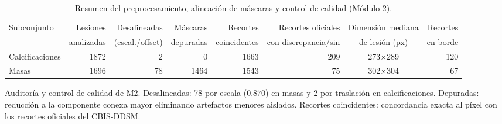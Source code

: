 \begin{table}[H]
\centering
\small
\caption{Resumen del preprocesamiento, alineación de máscaras y control de calidad (Módulo 2).}
\label{tab:anexo_m2_resumen}
\begin{adjustbox}{max width=\linewidth}
\begin{tabular}{l r r r r r c r}
\toprule
Subconjunto & Lesiones & Desalineadas & Máscaras & Recortes & Recortes oficiales & Dimensión mediana & Recortes \\
 & analizadas & (escal./offset) & depuradas & coincidentes & con discrepancia/sin & de lesión (px) & en borde \\
\midrule
Calcificaciones & 1872 & 2 & 0 & 1663 & 209 & 273$\times$289 & 120 \\
Masas & 1696 & 78 & 1464 & 1543 & 75 & 302$\times$304 & 67 \\
\bottomrule
\end{tabular}
\end{adjustbox}
\par\smallskip
\parbox{0.95\linewidth}{\footnotesize Auditoría y control de calidad de M2. Desalineadas: 78 por escala ($0.870$) en masas y 2 por traslación en calcificaciones. Depuradas: reducción a la componente conexa mayor eliminando artefactos menores aislados. Recortes coincidentes: concordancia exacta al píxel con los recortes oficiales del CBIS-DDSM.}
\end{table}
